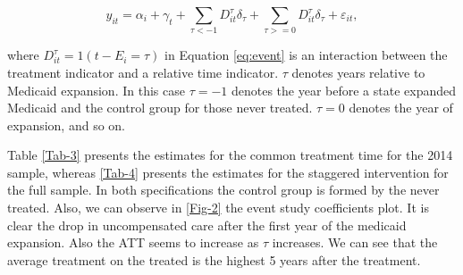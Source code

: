 \documentclass[
  12pt,
]{article}
\begin{document}
\begin{equation}
\label{eq:event}
y_{it} = \alpha_{i} + \gamma_{t} +\sum_{\tau < -1} D_{it}^{\tau} \delta_{\tau} + \sum_{\tau>=0} D_{it}^{\tau} \delta_{\tau} + \varepsilon_{it},
\end{equation}

where \(D_{it}^{\tau} = 1(t-E_{i}=\tau)\) in Equation \ref{eq:event} is
an interaction between the treatment indicator and a relative time
indicator. \(\tau\) denotes years relative to Medicaid expansion. In
this case \(\tau=-1\) denotes the year before a state expanded Medicaid
and the control group for those never treated. \(\tau=0\) denotes the
year of expansion, and so on.

Table \ref{Tab-3} presents the estimates for the common treatment time
for the 2014 sample, whereas \ref{Tab-4} presents the estimates for the
staggered intervention for the full sample. In both specifications the
control group is formed by the never treated. Also, we can observe in
\ref{Fig-2} the event study coefficients plot. It is clear the drop in
uncompensated care after the first year of the medicaid expansion. Also
the ATT seems to increase as \(\tau\) increases. We can see that the
average treatment on the treated is the highest 5 years after the
treatment.
\end{document}
